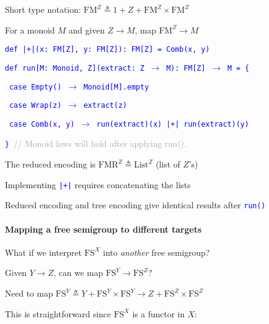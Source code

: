 Short type notation: $\text{FM}^{Z}\triangleq1+Z+\text{FM}^{Z}\times\text{FM}^{Z}$ 

For a monoid $M$ and given $Z\rightarrow M$, map $\text{FM}^{Z}\rightarrow M$

\texttt{\textcolor{blue}{\footnotesize{}def |+|(x: FM{[}Z{]}, y: FM{[}Z{]}): FM{[}Z{]}
= Comb(x, y)}}{\footnotesize\par}

\texttt{\textcolor{blue}{\footnotesize{}def run{[}M: Monoid, Z{]}(extract: Z
$\rightarrow$ M): FM{[}Z{]} $\rightarrow$ M = \{}}{\footnotesize\par}

\texttt{\textcolor{blue}{\footnotesize{}  case Empty() $\rightarrow$
Monoid{[}M{]}.empty}}{\footnotesize\par}

\texttt{\textcolor{blue}{\footnotesize{}  case Wrap(z) $\rightarrow$
extract(z)}}{\footnotesize\par}

\texttt{\textcolor{blue}{\footnotesize{}  case Comb(x, y) $\rightarrow$
run(extract)(x) |+| run(extract)(y)}}{\footnotesize\par}

\texttt{\textcolor{blue}{\footnotesize{}\} }}\textcolor{darkgray}{\footnotesize{}//
Monoid laws will hold after applying run().}{\footnotesize\par}

The reduced encoding is $\text{FMR}^{Z}\triangleq\text{List}^{Z}$
(list of $Z$\textsf{'}s)

Implementing \texttt{\textcolor{blue}{\footnotesize{}|+|}} requires
concatenating the lists 

Reduced encoding and tree encoding give identical results after \texttt{\textcolor{blue}{\footnotesize{}run()}} 


\paragraph{Mapping a free semigroup to different targets}

What if we interpret $\text{FS}^{X}$ into \emph{another} free semigroup?

Given $Y\rightarrow Z$, can we map $\text{FS}^{Y}\rightarrow\text{FS}^{Z}$?

Need to map $\text{FS}^{Y}\triangleq Y+\text{FS}^{Y}\times\text{FS}^{Y}\rightarrow Z+\text{FS}^{Z}\times\text{FS}^{Z}$

This is straightforward since $\text{FS}^{X}$ is a functor in $X$:

